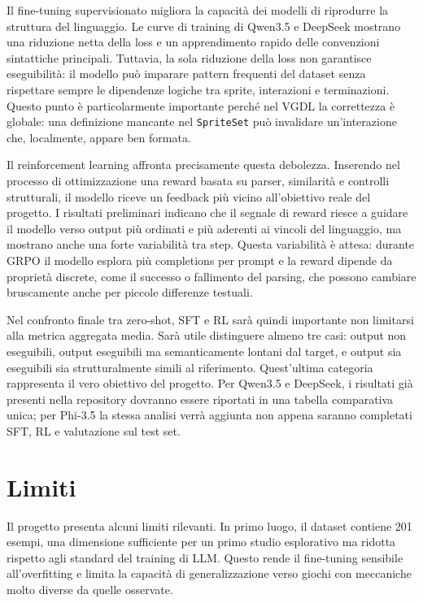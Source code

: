 \documentclass[final,5p,times,twocolumn]{elsarticle}
\begin{document}
Il fine-tuning supervisionato migliora la capacit\`a dei modelli di riprodurre la struttura del linguaggio. Le curve di training di Qwen3.5 e DeepSeek mostrano una riduzione netta della loss e un apprendimento rapido delle convenzioni sintattiche principali. Tuttavia, la sola riduzione della loss non garantisce eseguibilit\`a: il modello pu\`o imparare pattern frequenti del dataset senza rispettare sempre le dipendenze logiche tra sprite, interazioni e terminazioni. Questo punto \`e particolarmente importante perch\'e nel VGDL la correttezza \`e globale: una definizione mancante nel \texttt{SpriteSet} pu\`o invalidare un'interazione che, localmente, appare ben formata.

Il reinforcement learning affronta precisamente questa debolezza. Inserendo nel processo di ottimizzazione una reward basata su parser, similarit\`a e controlli strutturali, il modello riceve un feedback pi\`u vicino all'obiettivo reale del progetto. I risultati preliminari indicano che il segnale di reward riesce a guidare il modello verso output pi\`u ordinati e pi\`u aderenti ai vincoli del linguaggio, ma mostrano anche una forte variabilit\`a tra step. Questa variabilit\`a \`e attesa: durante GRPO il modello esplora pi\`u completions per prompt e la reward dipende da propriet\`a discrete, come il successo o fallimento del parsing, che possono cambiare bruscamente anche per piccole differenze testuali.

Nel confronto finale tra zero-shot, SFT e RL sar\`a quindi importante non limitarsi alla metrica aggregata media. Sar\`a utile distinguere almeno tre casi: output non eseguibili, output eseguibili ma semanticamente lontani dal target, e output sia eseguibili sia strutturalmente simili al riferimento. Quest'ultima categoria rappresenta il vero obiettivo del progetto. Per Qwen3.5 e DeepSeek, i risultati gi\`a presenti nella repository dovranno essere riportati in una tabella comparativa unica; per Phi-3.5 la stessa analisi verr\`a aggiunta non appena saranno completati SFT, RL e valutazione sul test set.

\section{Limiti}

Il progetto presenta alcuni limiti rilevanti. In primo luogo, il dataset contiene 201 esempi, una dimensione sufficiente per un primo studio esplorativo ma ridotta rispetto agli standard del training di LLM. Questo rende il fine-tuning sensibile all'overfitting e limita la capacit\`a di generalizzazione verso giochi con meccaniche molto diverse da quelle osservate.
\end{document}
